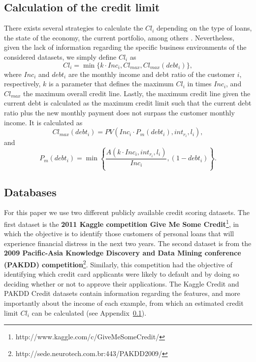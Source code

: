   \subsection{Calculation of the credit limit}\label{app_cli}
    There exists several strategies to calculate the $Cl_i$ depending on the type of loans, the 
    state of the economy, the current portfolio, among others \citep{Anderson2007,Lawrence2012}.
    Nevertheless, given the lack of information regarding the specific business environments of the 
    considered datasets, we simply define $Cl_i$ as
    \begin{equation}\label{eq:cli}
      Cl_i = \min \bigg\{ k \cdot Inc_i, Cl_{max}, Cl_{max}(debt_i) \bigg\},
    \end{equation}
    where $Inc_i$ and $debt_i$ are the monthly income and debt ratio of the customer $i$, 
    respectively, $k$ is a parameter that defines the maximum $Cl_i$ in times $Inc_i$, and 
    $Cl_{max}$ the maximum overall credit line. Lastly, the maximum credit line given the current 
    debt is calculated as the maximum credit limit such that the current debt ratio plus the new 
    monthly payment does not surpass the customer monthly income. It is calculated as
    \begin{equation}
      Cl_{max}(debt_i)=PV\left(Inc_i \cdot P_{m}(debt_i),int_{r_i},l_i\right),
    \end{equation}
    and
    \begin{equation}
      P_{m}(debt_i)=\min \left\{ \frac{A(k \cdot Inc_i,int_{r_i},l_i)}{Inc_i},\left(1-debt_i 
      \right) \right\}.
    \end{equation}

  \subsection{Databases}

    For this paper we use two different publicly available credit scoring datasets. The first 
    dataset is the \textbf{2011 Kaggle competition Give Me Some Credit}\footnote{ 
    http://www.kaggle.com/c/GiveMeSomeCredit/}, in which the objective is to identify those 
    customers of personal loans that will experience financial distress in the next two years.
    The second dataset is from the \textbf{2009 Pacific-Asia Knowledge Discovery and Data Mining 
    conference (PAKDD) competition}\footnote{http://sede.neurotech.com.br:443/PAKDD2009/}.
    Similarly, this competition had the objective of identifying which credit card applicants
    were likely to default and by doing so deciding whether or not to approve their applications.
    The Kaggle Credit and PAKDD Credit datasets contain information regarding the features, and 
    more importantly about the income of each example, from which an estimated credit limit 
    $Cl_i$ can be calculated (see Appendix~\ref{app_cli}).
    

